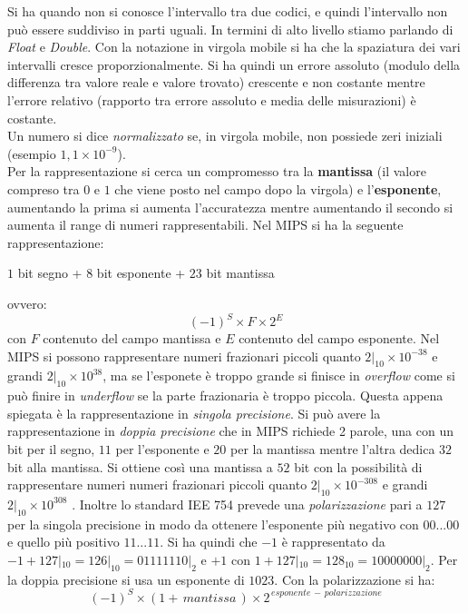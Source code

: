 \documentclass[a4paper,12pt, oneside]{book}
\begin{document}
\begin{enumerate}
  Si ha quando non si conosce l'intervallo tra due codici, e quindi l'intervallo non può essere suddiviso in parti uguali. In termini di alto livello stiamo parlando di \textit{Float} e \textit{Double}. Con la notazione in virgola mobile si ha che la spaziatura dei vari intervalli cresce proporzionalmente. Si ha quindi un errore assoluto (modulo della differenza tra valore reale e valore trovato) crescente e non costante mentre l'errore relativo (rapporto tra errore assoluto e media delle misurazioni) è costante.\\
  Un numero si dice \textit{normalizzato} se, in virgola mobile, non possiede zeri iniziali (esempio $1,1\times 10^{-9}$).\\
  Per la rappresentazione si cerca un compromesso tra la \textbf{mantissa} (il valore compreso tra $0$ e $1$ che viene posto nel campo dopo la virgola) e l'\textbf{esponente}, aumentando la prima si aumenta l'accuratezza mentre aumentando il secondo si aumenta il range di numeri rappresentabili. Nel MIPS si ha la seguente rappresentazione:\\
  \begin{center}
    $1$ bit segno + $8$ bit esponente + $23$ bit mantissa
  \end{center}
  ovvero:
  $$(-1)^S\times F\times 2^E$$
  con $F$ contenuto del campo mantissa e $E$ contenuto del campo esponente. Nel MIPS si possono rappresentare numeri frazionari piccoli quanto $2|_{10}\times 10^{-38}$ e grandi $2|_{10}\times 10^{38}$, ma se l'esponete è troppo grande si finisce in \textit{overflow} come si può finire in \textit{underflow} se la parte frazionaria è troppo piccola. Questa appena spiegata è la rappresentazione in \textit{singola precisione}. Si può avere la rappresentazione in \textit{doppia precisione} che in MIPS richiede 2 parole, una con un bit per il segno, $11$ per l'esponente e $20$ per la mantissa mentre l'altra dedica $32$ bit alla mantissa. Si ottiene così una mantissa a $52$ bit con la possibilità di rappresentare numeri numeri frazionari piccoli quanto $2|_{10}\times 10^{-308}$ e grandi $2|_{10}\times 10^{308}$ .  Inoltre lo standard IEE 754 prevede una \textit{polarizzazione} pari a $127$ per la singola precisione in modo da ottenere l'esponente più negativo con $00...00$ e quello più positivo $11...11$. Si ha quindi che $-1$  è rappresentato da $-1+127|_{10}=126|_{10}=01111110|_2$ e $+1$ con $1+127|_{10}=128_{10}=10000000|_2$. Per la doppia precisione si usa un esponente di $1023$. Con la polarizzazione si ha:
  $$(-1)^S\times(1+\, mantissa\,)\times 2^{\,esponente\,-\,polarizzazione} $$

\end{enumerate}
\end{document}
